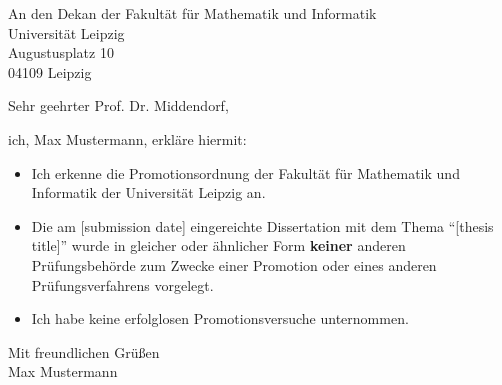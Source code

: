 \documentclass[
  fontsize=10pt,
  paper=a4,
  parskip=half,
  enlargefirstpage=true,    %
  fromalign=right,        %
  fromphone=on,           %
  fromrule=aftername,     %
  fromemail=true,         %
  addrfield=on,           %
  backaddress=on,         %
  subject=beforeopening,  %
  locfield=narrow,        %
  foldmarks=on,           %
]{scrlttr2}
\begin{document}
\emailname{\Email} %
\phonename{\Telefon} %
\setlength{\textheight}{13cm}



\begin{letter}{
An den Dekan der Fakult\"at f\"ur Mathematik und Informatik\\ 
Universit\"at Leipzig\\ 
Augustusplatz 10\\ 
04109 Leipzig}


\opening{Sehr geehrter Prof. Dr. Middendorf,} %

\smallskip

ich, Max Mustermann, erkl\"are hiermit:

\smallskip

\begin{itemize}
	\item Ich erkenne die Promotionsordnung der Fakult\"at f\"ur Mathematik und
	Informatik der Universit\"at Leipzig an.
	\item Die am [submission date] eingereichte Dissertation mit dem Thema 
	``[thesis title]''
	wurde in gleicher oder \"ahnlicher Form \textbf{keiner} anderen
	Pr{\"u}fungsbeh\"orde zum Zwecke einer Promotion oder eines anderen
	Pr{\"u}fungsverfahrens vorgelegt.
	\item Ich habe keine erfolglosen Promotionsversuche unternommen.
\end{itemize}

\smallskip

\closing{Mit freundlichen Grüßen\\[5pt]
Max Mustermann}

\end{letter}
\end{document}
